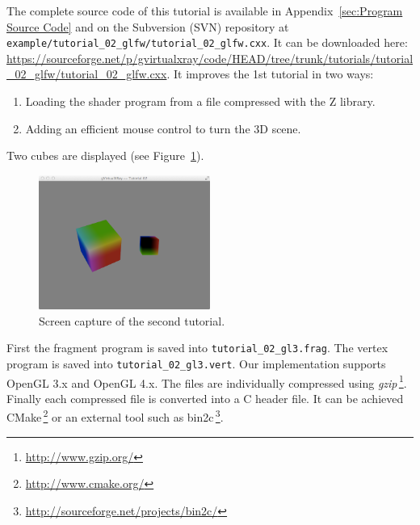 \documentclass[11pt,oneside,a4paper,final]{article}
\begin{document}
The complete source code of this tutorial is available in 
Appendix~\ref{sec:Program Source Code} and on the Subversion (SVN) repository 
at 
\verb+example/tutorial_02_glfw/tutorial_02_glfw.cxx+. 
It can be downloaded here: 
\url{
https://sourceforge.net/p/gvirtualxray/code/HEAD/tree/trunk/tutorials/tutorial_02_glfw/tutorial_02_glfw.cxx}.
It improves the 1st tutorial in two ways:
\begin{enumerate}
	\item Loading the shader program from a file compressed with the Z library.
	\item Adding an efficient mouse control to turn the 3D scene.
\end{enumerate}
Two cubes are displayed (see Figure~\ref{fig:scene}). 
\begin{figure}[bth]
 \centering
 \includegraphics[width=0.5\textwidth]{screenshot}
 \caption{\label{fig:scene} Screen capture of the second tutorial.}
\end{figure}
First the fragment program is saved into \verb+tutorial_02_gl3.frag+. 
The vertex program is saved into \verb+tutorial_02_gl3.vert+. 
Our implementation supports OpenGL 3.x and OpenGL 4.x. 
The files are individually compressed using \textit{gzip}\,\footnote{\url{http://www.gzip.org/}}. 
Finally each compressed file is converted into a C header file. 
It can be achieved CMake\,\footnote{\url{http://www.cmake.org/}} or an external tool such as bin2c\,\footnote{\url{http://sourceforge.net/projects/bin2c/}}. 
\end{document}
